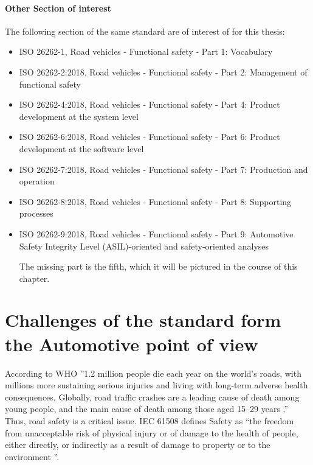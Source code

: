 \documentclass[./dissertation.tex]{subfiles}
\begin{document}
\paragraph{Other Section of interest}
The following section of the same standard are of interest of for this thesis:
\begin{itemize}
\item ISO 26262-1, Road vehicles - Functional safety - Part 1: Vocabulary \cite{iso26262-1}
\item ISO 26262-2:2018, Road vehicles - Functional safety - Part 2: Management of functional safety \cite{iso26262-2}
\item ISO 26262-4:2018, Road vehicles - Functional safety - Part 4: Product development at the system level \cite{iso26262-4}
\item ISO 26262-6:2018, Road vehicles - Functional safety - Part 6: Product development at the software level \cite{iso26262-6}
\item ISO 26262-7:2018, Road vehicles - Functional safety - Part 7: Production and operation \cite{iso26262-7}
\item ISO 26262-8:2018, Road vehicles - Functional safety - Part 8: Supporting processes \cite{iso26262-8}
\item ISO 26262-9:2018, Road vehicles - Functional safety - Part 9: Automotive Safety Integrity Level (ASIL)-oriented and safety-oriented analyses \cite{iso26262-9}

The missing part is the fifth, which it will be pictured in the course of this chapter.
\end{itemize}



\section{Challenges of the standard form the Automotive point of view}

According to WHO ”1.2 million people die each year on the world's roads, with millions more sustaining serious injuries and living with long-term adverse health consequences. Globally, road traffic crashes are a leading cause of death among young people, and the main cause of death among those aged 15–29 years \cite{yeung-2018}.” Thus, road safety is a critical issue. IEC 61508 defines Safety as “the freedom from unacceptable risk of physical injury or of damage to the health of people, either directly, or indirectly as a result of damage to property or to the environment \cite{bell2006introduction}”.
\end{document}
